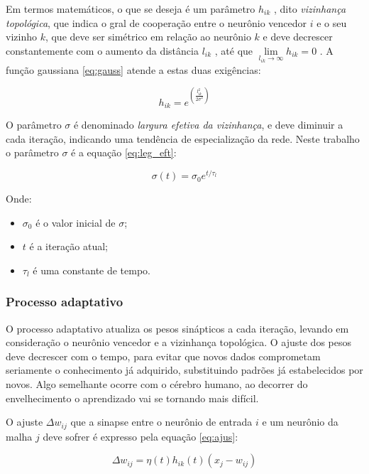 Em termos matemáticos, o que se deseja é um parâmetro $ h_{ik} $ , dito
\textit{vizinhança topológica}, que indica o gral de cooperação entre o
neurônio vencedor $ i $ e o seu vizinho $ k $, que deve ser simétrico em relação
ao neurônio $ k $ e deve decrescer constantemente com o aumento da
distância $ l_{ik} $ , até que $ \lim\limits_{ l_{ik} \to \infty } h_{ik} = 0 $ .
A função gaussiana \ref{eq:gauss} atende a estas duas exigências:

\begin{equation}\label{eq:gauss}
h_{ik} = e^{ \left( \frac{ l_{ik}^2 }{ 2 \sigma^2 } \right) }
\end{equation}

O parâmetro $ \sigma $ é denominado \textit{largura efetiva da vizinhança},
e deve diminuir a cada iteração, indicando uma tendência de especialização da
rede. Neste trabalho o parâmetro $ \sigma $ é a equação \ref{eq:leg_eft}:

\begin{equation}\label{eq:leg_eft}
\sigma(t) = \sigma_0 e^{ t / \tau_l }
\end{equation}

Onde:

\begin{itemize}
\item $ \sigma_0 $ é o valor inicial de $ \sigma $;
\item $ t $ é a iteração atual;
\item $ \tau_l $ é uma constante de tempo.
\end{itemize}

\subsubsection{Processo adaptativo}

O processo adaptativo atualiza os pesos sinápticos a cada iteração, levando em
consideração o neurônio vencedor e a vizinhança topológica. O ajuste dos pesos
deve decrescer com o tempo, para evitar que novos dados comprometam seriamente
o conhecimento já adquirido, substituindo padrões já estabelecidos por novos.
Algo semelhante ocorre com o cérebro humano, ao decorrer do envelhecimento o
aprendizado vai se tornando mais difícil.

O ajuste $ \Delta w_{ij} $ que a sinapse entre o neurônio de entrada $ i $ e
um neurônio da malha $ j $ deve sofrer é expresso pela equação \ref{eq:ajus}:

\begin{equation}\label{eq:ajus}
\Delta w_{ij} = \eta(t) h_{ik}(t) (x_j - w_{ij})
\end{equation}

